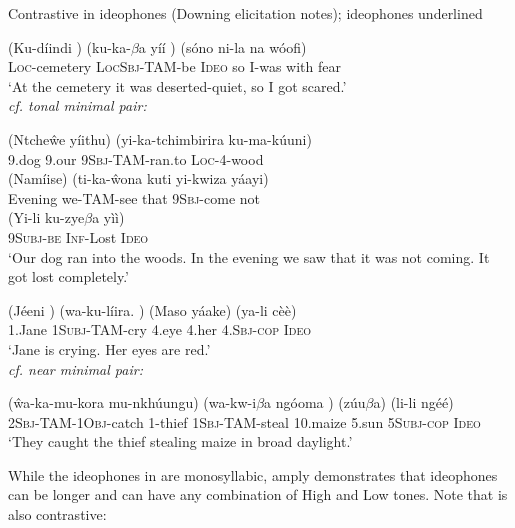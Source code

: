 \documentclass[output=paper
,newtxmath
,modfonts
,nonflat]{langsci/langscibook}
\begin{document}
\ea\label{ex:downing:5} Contrastive  in  ideophones (Downing elicitation notes); ideophones underlined
 
\ea\label{ex:downing:5a} \gll (Ku-díindi )   (ku-ka-$\beta $a    yíí )  (sóno   ni-la   na wóofi)\\
  \textsc{Loc}-cemetery {} \textsc{LocSbj}{}-TAM-be  \textsc{Ideo} {} so    I-was  with fear\\
\glt ‘At the cemetery it was deserted-quiet, so I got scared.’\\

\textit{cf. tonal minimal pair:}

\ex\label{ex:downing:5b} \gll (Ntche\^we yíithu) (yi-ka-tchimbirira   ku-ma-kúuni) \\
  9.dog   9.our  9\textsc{Sbj}{}-TAM-ran.to  \textsc{Loc}{}-4-wood\\
  \glt
\gll (Namíise) (ti-ka-\^wona   kuti yi-kwiza    yáayi)\\
  Evening     we-TAM-see  that 9\textsc{Sbj-}come    not\\
  \glt
\gll  (Yi-li    ku-zye$\beta $a   yìì)\\
  9\textsc{Subj-be}   \textsc{Inf-}Lost        \textsc{Ideo}\\
\glt ‘Our dog ran into the woods. In the evening we saw that it was not coming. It got lost completely.’

\ex\label{ex:downing:5c} \gll (Jéeni )  (wa-ku-líira. )  (Maso   yáake)   (ya-li    cèè)\\
  1.Jane {} 1\textsc{Subj}{}-TAM-cry {}  4.eye  4.her {} 4.S\textsc{bj-cop} \textsc{Ideo}\\
\glt ‘Jane is crying. Her eyes are red.’\\
\textit{cf. near minimal pair:}

\ex\label{ex:downing:5d} \gll (\^wa-ka-mu-kora     mu-nkhúungu) (wa-kw-i$\beta $a   ngóoma ) (zúu$\beta $a)  (li-li      ngéé)\\
  \textsc{2Sbj}{}-TAM-\textsc{1Obj}{}-catch  1-thief  \textsc{1Sbj}{}-TAM-steal  10.maize {} 5.sun  \textsc{5Subj-cop}  \textsc{Ideo}\\
\glt ‘They caught the thief stealing maize in broad daylight.’
\z
\z

While the ideophones in  are monosyllabic, \citet{Mphande1989} amply demonstrates that ideophones can be longer and can have any combination of High and Low tones. Note that  is also contrastive:

\begin{comment} 
\ea 
 \gll \\
   \\
 \glt
\z
\end{comment}
\end{document}
